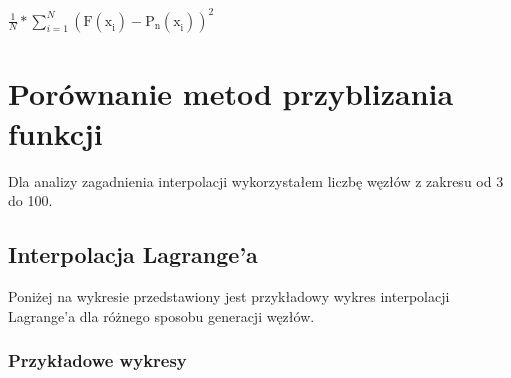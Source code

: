 \documentclass{article}
\begin{document}
\begin{center}
\(\frac{1}{N} * \sum_{i = 1}^{N}\mathrm{(F(\mathrm{x}_{i}^{}) - \mathrm{P}_{n}^{}(\mathrm{x}_{i}^{}))}_{}^{2}\)
\end{center}

\section{Porównanie metod przyblizania funkcji}

Dla analizy zagadnienia interpolacji wykorzystałem liczbę węzłów z zakresu od 3 do 100. 

\subsection{Interpolacja Lagrange'a}

\noindent
Poniżej na wykresie przedstawiony jest przykładowy wykres interpolacji Lagrange'a dla różnego sposobu generacji węzłów.

\subsubsection{Przykładowe wykresy}
\end{document}
